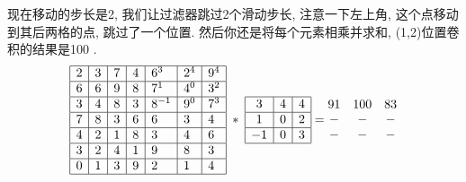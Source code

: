 \begin{example}
现在移动的步长是2, 我们让过滤器跳过2个滑动步长, 注意一下左上角, 这个点移动到其后两格的点, 跳过了一个位置.
然后你还是将每个元素相乘并求和, (1,2)位置卷积的结果是100 .
\begin{align*}
\begin{array}{|l|l|l|l|l|l|l|}
\hline 2 & 3 & 7 & 4 & 6^{3} & 2^{4} & 9^{4} \\
\hline 6 & 6 & 9 & 8 & 7^{1} & 4^{0} & 3^{2} \\
\hline 3 & 4 & 8 & 3 & 8^{-1} & 9^{0} & 7^{3} \\
\hline 7 & 8 & 3 & 6 & 6 & 3 & 4 \\
\hline 4 & 2 & 1 & 8 & 3 & 4 & 6 \\
\hline 3 & 2 & 4 & 1 & 9 & 8 & 3 \\
\hline 0 & 1 & 3 & 9 & 2 & 1 & 4 \\
\hline
\end{array}
\;*\;
\begin{array}{|c|c|c|}
\hline 3 & 4 & 4 \\
\hline 1 & 0 & 2 \\
\hline-1 & 0 & 3 \\
\hline
\end{array}
=
\begin{matrix}
91 &100&83\\
-&- &- \\
-&- &-\\
\end{matrix}
\end{align*}


\end{example}
